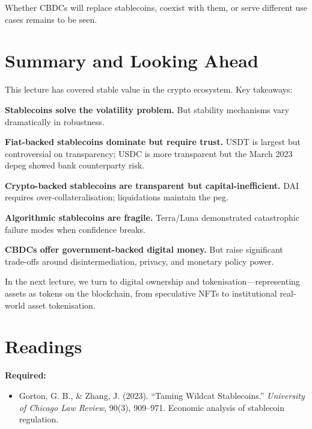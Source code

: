 \documentclass[11pt,a4paper]{article}
\begin{document}
Whether CBDCs will replace stablecoins, coexist with them, or serve different use cases remains to be seen.

\section{Summary and Looking Ahead}

This lecture has covered stable value in the crypto ecosystem. Key takeaways:

\textbf{Stablecoins solve the volatility problem.} But stability mechanisms vary dramatically in robustness.

\textbf{Fiat-backed stablecoins dominate but require trust.} USDT is largest but controversial on transparency; USDC is more transparent but the March 2023 depeg showed bank counterparty risk.

\textbf{Crypto-backed stablecoins are transparent but capital-inefficient.} DAI requires over-collateralisation; liquidations maintain the peg.

\textbf{Algorithmic stablecoins are fragile.} Terra/Luna demonstrated catastrophic failure modes when confidence breaks.

\textbf{CBDCs offer government-backed digital money.} But raise significant trade-offs around disintermediation, privacy, and monetary policy power.

In the next lecture, we turn to digital ownership and tokenisation---representing assets as tokens on the blockchain, from speculative NFTs to institutional real-world asset tokenisation.

\section*{Readings}

\textbf{Required:}
\begin{itemize}
    \item Gorton, G. B., \& Zhang, J. (2023). ``Taming Wildcat Stablecoins.'' \textit{University of Chicago Law Review}, 90(3), 909--971. Economic analysis of stablecoin regulation.
\end{itemize}
\end{document}
